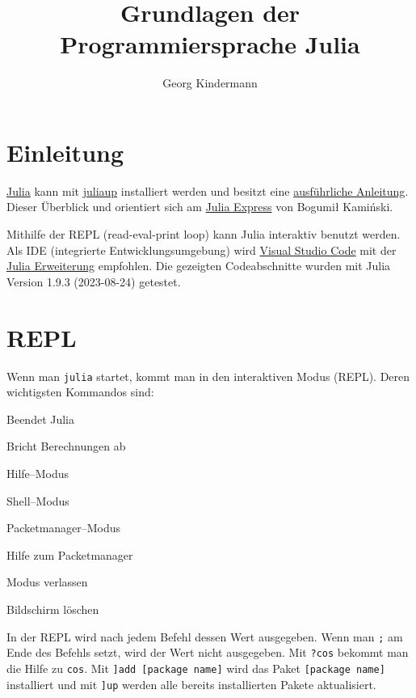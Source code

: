 \documentclass[10pt,twocolumn]{scrartcl}
\title{Grundlagen der Programmiersprache Julia}
\author{Georg Kindermann}
\begin{document}
\maketitle


\tableofcontents

\section{Einleitung}
\label{sec:einleitung}

\href{https://julialang.org/}{Julia} kann mit
\href{https://github.com/JuliaLang/juliaup}{juliaup} installiert werden und
besitzt eine \href{https://docs.julialang.org/en/v1/}{ausführliche Anleitung}.
Dieser Überblick und orientiert sich am
\href{https://github.com/bkamins/The-Julia-Express}{Julia Express} von Bogumił
Kamiński.

Mithilfe der REPL (read-eval-print loop) kann Julia interaktiv benutzt werden.
Als IDE (integrierte Entwicklungsumgebung) wird
\href{https://code.visualstudio.com/}{Visual Studio Code} mit der
\href{https://www.julia-vscode.org/}{Julia Erweiterung}
empfohlen. Die gezeigten Codeabschnitte wurden mit Julia Version  1.9.3
(2023-08-24) getestet.

\section{REPL}
\label{sec:repl}

Wenn man \lstinline|julia| startet, kommt man in den interaktiven Modus (REPL).
Deren wichtigsten Kommandos sind:
\begin{description}[style=multiline,leftmargin=2cm,nolistsep]
  \item[CTRL+d] Beendet Julia
  \item[CTRL+c] Bricht Berechnungen ab
  \item[?] Hilfe--Modus
  \item[;] Shell--Modus
  \item[{]}] Packetmanager--Modus
  \item[{]?}] Hilfe zum Packetmanager
  \item[Backspace] Modus verlassen
  \item[CTRL+l] Bildschirm löschen
\end{description}
In der REPL wird nach jedem Befehl dessen Wert ausgegeben. Wenn man
\lstinline|;| am Ende des Befehls setzt, wird der Wert nicht ausgegeben. Mit
\lstinline|?cos| bekommt man die Hilfe zu \lstinline|cos|. Mit
\lstinline|]add [package name]| wird das Paket
\lstinline|[package name]| installiert und mit
\lstinline|]up| werden alle bereits installierten Pakete aktualisiert.
\end{document}
